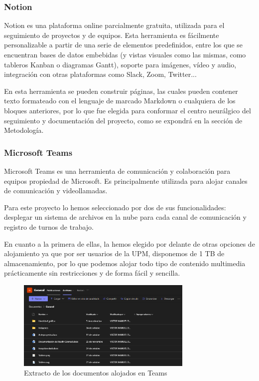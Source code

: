         \subsubsection{Notion}
            Notion es una plataforma online parcialmente gratuita, utilizada para el seguimiento de proyectos y de 
            equipos. Esta herramienta es fácilmente personalizable a partir de una serie de elementos predefinidos, 
            entre los que se encuentran bases de datos embebidas (y vistas visuales como las mismas, como tableros 
            Kanban o diagramas Gantt), soporte para imágenes, vídeo y audio, integración con otras plataformas como 
            Slack, Zoom, Twitter... 
                
            En esta herramienta se pueden construir páginas, las cuales pueden contener texto formateado con el 
            lenguaje de marcado Markdown o cualquiera de los bloques anteriores, por lo que fue elegida para conformar 
            el centro neurálgico del seguimiento y documentación del proyecto, como se expondrá en la sección de 
            Metodología. 
            
        \subsubsection{Microsoft Teams}
            Microsoft Teams es una herramienta de comunicación y colaboración para equipos propiedad de Microsoft. 
            Es principalmente utilizada para alojar canales de comunicación y videollamadas. 
                
            Para este proyecto lo hemos seleccionado por dos de sus funcionalidades: desplegar un sistema de archivos 
            en la nube para cada canal de comunicación y registro de turnos de trabajo. 
            
            En cuanto a la primera de ellas, la hemos elegido por delante de otras opciones de alojamiento ya 
            que por ser usuarios de la UPM, disponemos de 1 TB de almacenamiento, por lo que podemos alojar todo 
            tipo de contenido multimedia prácticamente sin restricciones y de forma fácil y sencilla. 
            
            \begin{figure}[h]
                \centering
                \includegraphics[width=0.75\textwidth]{figures/archivos teams.PNG}
                \caption{Extracto de los documentos alojados en Teams}
                \label{fig:teams:documentos}
            \end{figure}
            
